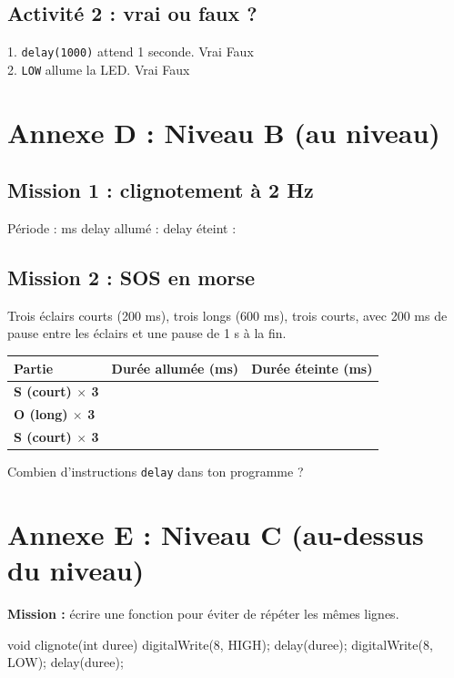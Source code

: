 \documentclass[11pt,a4paper]{article}
\begin{document}
\subsection*{Activité 2 : vrai ou faux ?}
1. \texttt{delay(1000)} attend 1 seconde. \cb Vrai \cb Faux\\
2. \texttt{LOW} allume la LED. \cb Vrai \cb Faux

\newpage
\section*{Annexe D : Niveau B (au niveau)}

\subsection*{Mission 1 : clignotement à 2 Hz}
Période : \dotfill{} ms \quad delay allumé : \dotfill{} \quad delay éteint : \dotfill

\subsection*{Mission 2 : SOS en morse}
Trois éclairs courts (200 ms), trois longs (600 ms), trois courts, avec 200 ms de pause entre les éclairs et une pause de 1 s à la fin.

\begin{tabularx}{\linewidth}{>{\bfseries}p{3cm}Y Y}
\toprule
Partie & Durée allumée (ms) & Durée éteinte (ms)\\
\midrule
S (court) $\times$ 3 & & \\
O (long) $\times$ 3 & & \\
S (court) $\times$ 3 & & \\
\bottomrule
\end{tabularx}

Combien d'instructions \texttt{delay} dans ton programme ? \dotfill

\newpage
\section*{Annexe E : Niveau C (au-dessus du niveau)}

\textbf{Mission :} écrire une fonction pour éviter de répéter les mêmes lignes.

\begin{arduino}
void clignote(int duree) {
  digitalWrite(8, HIGH);
  delay(duree);
  digitalWrite(8, LOW);
  delay(duree);
}
\end{arduino}
\end{document}
